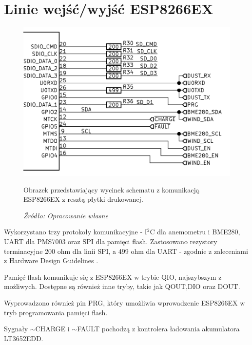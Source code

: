 \documentclass[12pt,a4paper,oneside]{memoir}
\begin{document}
\section{Linie wejść/wyjść ESP8266EX}
\begin{figure}[!h]
	\centering
	\includegraphics[scale=0.2]{images/sch/sch-11.png}
	{\tytulyrozdzialow \footnotesize \caption[Schemat - komunikacja ESP8266EX z resztą płytki] {Obrazek przedstawiający wycinek schematu z komunikacją ESP8266EX z resztą płytki drukowanej.}}
	\caption*{\textit{Źródło: Opracowanie własne}}
\end{figure}
\par Wykorzystano trzy protokoły komunikacyjne - I$^2$C dla anemometru i BME280, UART dla PMS7003 oraz SPI dla pamięci flash. Zastosowano rezystory terminacyjne 200 ohm dla linii SPI, a 499 ohm dla UART - zgodnie z zaleceniami z Hardware Design Guidelines \cite{esp8266exhdg}. 
\par Pamięć flash komunikuje się z ESP8266EX w trybie QIO, najszybszym z możliwych. Dostępne są również inne tryby, takie jak QOUT,DIO oraz DOUT.
\par Wyprowadzono również pin PRG, który umożliwia wprowadzenie ESP8266EX w tryb programowania pamięci flash.
\par Sygnały {$\sim$CHARGE} i {$\sim$FAULT} pochodzą z kontrolera ładowania akumulatora LT3652EDD.
\newpage
\end{document}
